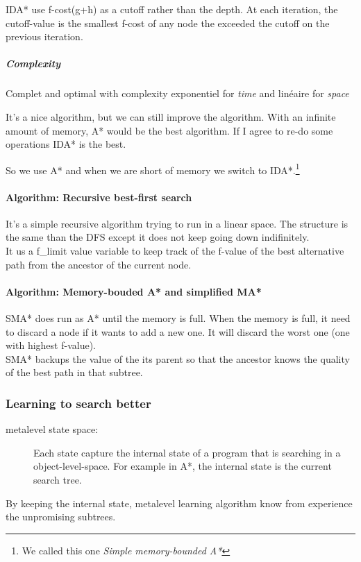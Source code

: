 IDA* use f-cost(g+h) as a cutoff rather than the depth. At each iteration, 
the cutoff-value is the smallest f-cost of any node the exceeded the cutoff on 
the previous iteration.

\subparagraph{Complexity} Complet and  optimal with  complexity exponentiel for \textit{time}
and linéaire for \textit{space} 

It's a nice  algorithm, but we can still improve  the algorithm. With an
infinite amount of memory, A* would be the best algorithm. If I agree to
re-do  some operations  IDA* is  the  best. 

So  we  use A*  and when  we
are  short of  memory we  switch  to IDA*.\footnote{We  called this  one
\textit{Simple memory-bounded A*}}


\paragraph{Algorithm: Recursive best-first search}
It's a simple recursive algorithm trying to run in a linear space. The structure is 
the same than the DFS except it does not keep going down indifinitely.\\
It us a f\_limit value variable to keep track of the f-value of the best alternative path
from the ancestor of the current node.


\paragraph{Algorithm: Memory-bouded A* and simplified MA*}
SMA* does run as A* until the memory is full. When the memory is full, it need to discard a 
node if it wants to add a new one. It will discard the worst one (one with highest f-value).\\
SMA* backups the value of the its parent so that the ancestor knows the quality of the best
path in that subtree.


\subsubsection{Learning to search better}
\begin{description}
\item [metalevel state space:] Each state capture the internal state of a program that is searching in
a object-level-space. For example in A*, the internal state is the current search tree.
\end{description}
By keeping the internal state, metalevel learning algorithm know from experience the unpromising 
subtrees.

